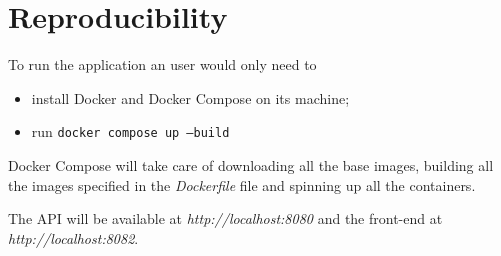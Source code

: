 \section{Reproducibility}
To run the application an user would only need to
\begin{itemize}
        \item install Docker and Docker Compose on its machine;
        \item run \texttt{docker compose up --build}
\end{itemize}

Docker Compose will take care of downloading all the base images,
building all the images specified in the \textit{Dockerfile} file
and spinning up all the containers.

The API will be available at \textit{http://localhost:8080} and the
front-end at \textit{http://localhost:8082}.
